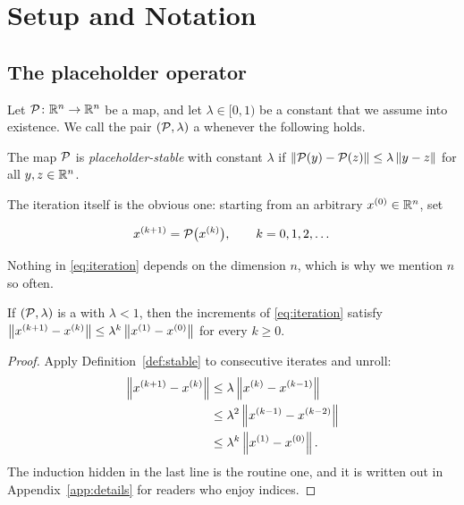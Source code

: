 \section{Setup and Notation}
\label{sec:method}

\subsection{The placeholder operator}
\label{sec:operator}

Let $\mathcal{P} \colon \mathbb{R}^{n} \to \mathbb{R}^{n}$ be a map, and let $\lambda \in [0,1)$
be a constant that we assume into existence.  We call the pair $(\mathcal{P},\lambda)$
a \emph{\fixturename} whenever the following holds.

\begin{placeholderdef}
\label{def:stable}
The map $\mathcal{P}$ is \emph{placeholder-stable} with constant $\lambda$ if
$\left\lVert \mathcal{P}(y) - \mathcal{P}(z) \right\rVert \le \lambda \left\lVert y - z \right\rVert$ for all
$y, z \in \mathbb{R}^{n}$.
\end{placeholderdef}

The iteration itself is the obvious one: starting from an arbitrary
$x^{(0)} \in \mathbb{R}^{n}$, set

\begin{equation}
  \label{eq:iteration}
  x^{(k+1)} = \mathcal{P}\bigl(x^{(k)}\bigr),
  \qquad k = 0, 1, 2, \dots
\end{equation}

Nothing in \eqref{eq:iteration} depends on the dimension $n$, which is why we
mention $n$ so often.

\begin{placeholderlem}
\label{lem:contraction}
If $(\mathcal{P},\lambda)$ is a \fixturename{} with $\lambda < 1$, then the increments
of \eqref{eq:iteration} satisfy
$\left\lVert x^{(k+1)} - x^{(k)} \right\rVert \le \lambda^{k}\left\lVert x^{(1)} - x^{(0)} \right\rVert$ for
every $k \ge 0$.
\end{placeholderlem}

\begin{proof}
Apply Definition~\ref{def:stable} to consecutive iterates and unroll:
\begin{align}
  \left\lVert x^{(k+1)} - x^{(k)} \right\rVert
    &\le \lambda \left\lVert x^{(k)} - x^{(k-1)} \right\rVert \label{eq:step} \\
    &\le \lambda^{2} \left\lVert x^{(k-1)} - x^{(k-2)} \right\rVert \nonumber \\
    &\le \lambda^{k} \left\lVert x^{(1)} - x^{(0)} \right\rVert . \nonumber
\end{align}
The induction hidden in the last line is the routine one, and it is written out
in Appendix~\ref{app:details} for readers who enjoy indices.
\end{proof}

